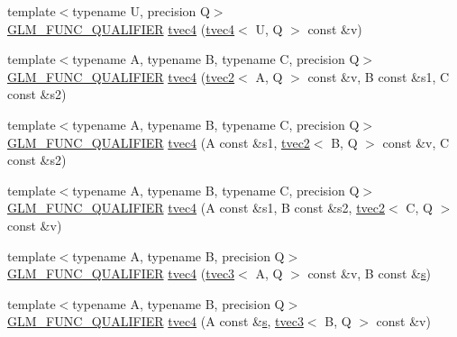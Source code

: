 \begin{DoxyCompactItemize}
\item 
{\footnotesize template$<$typename U, precision Q$>$ }\\\hyperlink{setup_8hpp_a33fdea6f91c5f834105f7415e2a64407}{G\+L\+M\+\_\+\+F\+U\+N\+C\+\_\+\+Q\+U\+A\+L\+I\+F\+I\+ER} \hyperlink{structglm_1_1detail_1_1tvec4_a6862f9f921f782523d5d9bfb099ce621}{tvec4} (\hyperlink{structglm_1_1detail_1_1tvec4}{tvec4}$<$ U, Q $>$ const \&v)
\item 
{\footnotesize template$<$typename A, typename B, typename C, precision Q$>$ }\\\hyperlink{setup_8hpp_a33fdea6f91c5f834105f7415e2a64407}{G\+L\+M\+\_\+\+F\+U\+N\+C\+\_\+\+Q\+U\+A\+L\+I\+F\+I\+ER} \hyperlink{structglm_1_1detail_1_1tvec4_a88c6b7ecdef152cdf340eaf39b4e4606}{tvec4} (\hyperlink{structglm_1_1detail_1_1tvec2}{tvec2}$<$ A, Q $>$ const \&v, B const \&s1, C const \&s2)
\item 
{\footnotesize template$<$typename A, typename B, typename C, precision Q$>$ }\\\hyperlink{setup_8hpp_a33fdea6f91c5f834105f7415e2a64407}{G\+L\+M\+\_\+\+F\+U\+N\+C\+\_\+\+Q\+U\+A\+L\+I\+F\+I\+ER} \hyperlink{structglm_1_1detail_1_1tvec4_ad501d232fe0d59f7734803371445a9cd}{tvec4} (A const \&s1, \hyperlink{structglm_1_1detail_1_1tvec2}{tvec2}$<$ B, Q $>$ const \&v, C const \&s2)
\item 
{\footnotesize template$<$typename A, typename B, typename C, precision Q$>$ }\\\hyperlink{setup_8hpp_a33fdea6f91c5f834105f7415e2a64407}{G\+L\+M\+\_\+\+F\+U\+N\+C\+\_\+\+Q\+U\+A\+L\+I\+F\+I\+ER} \hyperlink{structglm_1_1detail_1_1tvec4_a5ba14812472c30b9d34fdafa413c1846}{tvec4} (A const \&s1, B const \&s2, \hyperlink{structglm_1_1detail_1_1tvec2}{tvec2}$<$ C, Q $>$ const \&v)
\item 
{\footnotesize template$<$typename A, typename B, precision Q$>$ }\\\hyperlink{setup_8hpp_a33fdea6f91c5f834105f7415e2a64407}{G\+L\+M\+\_\+\+F\+U\+N\+C\+\_\+\+Q\+U\+A\+L\+I\+F\+I\+ER} \hyperlink{structglm_1_1detail_1_1tvec4_acdd7a9ea34155ac8f12b5959e599206b}{tvec4} (\hyperlink{structglm_1_1detail_1_1tvec3}{tvec3}$<$ A, Q $>$ const \&v, B const \&\hyperlink{structglm_1_1detail_1_1tvec4_a82cbced4cbd070056c5acbc1d4d4906f}{s})
\item 
{\footnotesize template$<$typename A, typename B, precision Q$>$ }\\\hyperlink{setup_8hpp_a33fdea6f91c5f834105f7415e2a64407}{G\+L\+M\+\_\+\+F\+U\+N\+C\+\_\+\+Q\+U\+A\+L\+I\+F\+I\+ER} \hyperlink{structglm_1_1detail_1_1tvec4_aea55658ec0e7bb02b83a8cc618de125c}{tvec4} (A const \&\hyperlink{structglm_1_1detail_1_1tvec4_a82cbced4cbd070056c5acbc1d4d4906f}{s}, \hyperlink{structglm_1_1detail_1_1tvec3}{tvec3}$<$ B, Q $>$ const \&v)

\end{DoxyCompactItemize}
